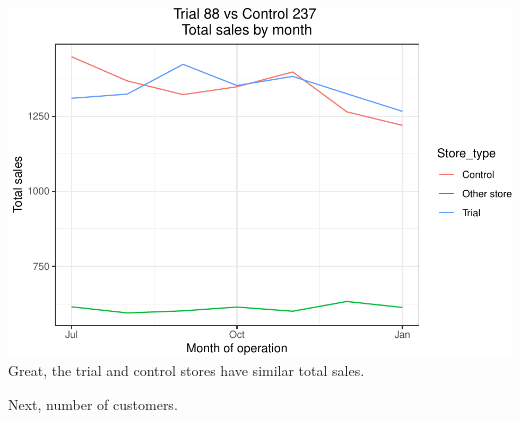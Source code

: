 \documentclass[]{article}
\begin{document}
\includegraphics{Task2_files/figure-latex/unnamed-chunk-14-1.pdf} Great,
the trial and control stores have similar total sales.

Next, number of customers.
\end{document}
